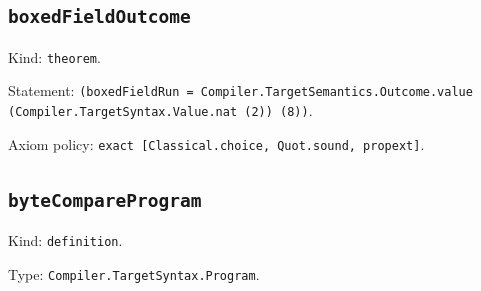 \documentclass[11pt]{article}
\begin{document}
\subsection*{\texttt{boxedFieldOutcome}}
\noindent Kind: \texttt{theorem}.\par
\noindent Statement: \texttt{(boxedFieldRun = Compiler.TargetSemantics.Outcome.value (Compiler.TargetSyntax.Value.nat (2)) (8))}.\par
\noindent Axiom policy: \texttt{exact [Classical.choice, Quot.sound, propext]}.\par
\subsection*{\texttt{byteCompareProgram}}
\noindent Kind: \texttt{definition}.\par
\noindent Type: \texttt{Compiler.TargetSyntax.Program}.\par
\end{document}
